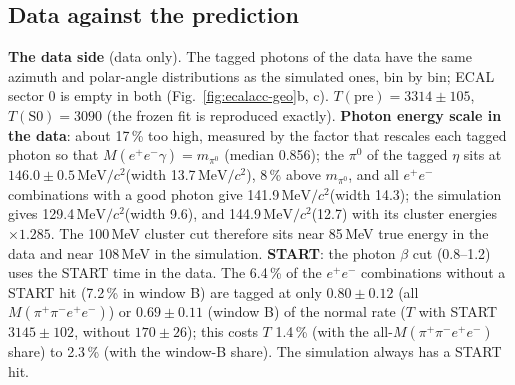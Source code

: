 \documentclass[11pt,a4paper]{article}
\newcommand{\piz}{\ensuremath{\pi^{0}}\xspace}
\newcommand{\ee}{\ensuremath{e^{+}e^{-}}\xspace}
\newcommand{\Mfour}{\ensuremath{M(\pi^{+}\pi^{-}e^{+}e^{-})}\xspace}
\newcommand{\MeVcc}{\ensuremath{\mathrm{MeV}/c^{2}}\xspace}
\begin{document}
\subsection{Data against the prediction}
\label{sec:ecalacc-data}
\textbf{The data side} (data only). The tagged photons of the data have the same azimuth and polar-angle distributions as the simulated ones, bin
by bin; ECAL sector 0 is empty in both (Fig.~\ref{fig:ecalacc-geo}b, c). $T(\mathrm{pre})=3314\pm105$, $T(\mathrm{S0})=3090$ (the frozen fit is
reproduced exactly). \textbf{Photon energy scale in the data}: about 17\,\% too high, measured by the factor that rescales each tagged photon so that
$M(\ee\gamma)=m_{\piz}$ (median 0.856); the \piz of the tagged $\eta$ sits at $146.0\pm0.5$\,\MeVcc (width 13.7\,\MeVcc), 8\,\% above $m_{\piz}$, and
all \ee combinations with a good photon give 141.9\,\MeVcc (width 14.3); the simulation gives 129.4\,\MeVcc (width 9.6), and 144.9\,\MeVcc (12.7) with
its cluster energies $\times1.285$. The 100\,MeV cluster cut therefore sits near 85\,MeV true energy in the data and near 108\,MeV in the
simulation. \textbf{START}: the photon $\beta$ cut (0.8--1.2) uses the START time in the data. The 6.4\,\% of the \ee combinations without a START hit
(7.2\,\% in window B) are tagged at only $0.80\pm0.12$ (all \Mfour) or $0.69\pm0.11$ (window B) of the normal rate ($T$ with START $3145\pm102$,
without $170\pm26$); this costs $T$ 1.4\,\% (with the all-\Mfour share) to 2.3\,\% (with the window-B share). The simulation always has a START hit.
\end{document}
